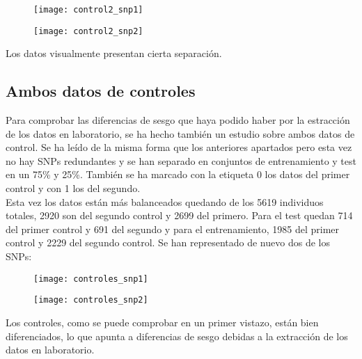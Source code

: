 \begin{figure}[H]
\centering
\begin{minipage}{.5\textwidth}
  \centering
  \texttt{[image: control2\_snp1]}
  \label{fig:snp1-control1}
\end{minipage}%
\begin{minipage}{.5\textwidth}
  \centering
  \texttt{[image: control2\_snp2]}
  \label{fig:snp2-control1}
\end{minipage}
\end{figure}

Los datos visualmente presentan cierta separación.

\subsection{Ambos datos de controles}
Para comprobar las diferencias de sesgo que haya podido haber por la estracción de los datos en laboratorio, se ha hecho también un estudio sobre ambos datos de control. Se ha leído de la misma forma que los anteriores apartados pero esta vez no hay SNPs redundantes y se han separado en conjuntos de entrenamiento y test en un 75\% y 25\%. También se ha marcado con la etiqueta 0 los datos del primer control y con 1 los del segundo.\\
Esta vez los datos están más balanceados quedando de los 5619 individuos totales, 2920 son del segundo control y 2699 del primero. Para el test quedan 714 del primer control y 691 del segundo y para el entrenamiento, 1985 del primer control y 2229 del segundo control. Se han representado de nuevo dos de los SNPs:

\begin{figure}[H]
\centering
\begin{minipage}{.5\textwidth}
  \centering
  \texttt{[image: controles\_snp1]}
  \label{fig:snp1-control1}
\end{minipage}%
\begin{minipage}{.5\textwidth}
  \centering
  \texttt{[image: controles\_snp2]}
  \label{fig:snp2-control1}
\end{minipage}
\end{figure}

Los controles, como se puede comprobar en un primer vistazo, están bien diferenciados, lo que apunta a diferencias de sesgo debidas a la extracción de los datos en laboratorio.


